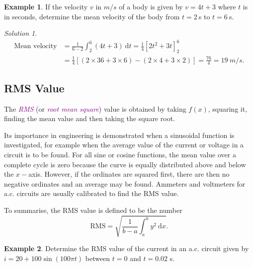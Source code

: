 \documentclass[
  english,
  11pt,
  oneside]{book}
\newcommand{\slide}{}
\theoremstyle{definition}
\theoremstyle{definition}
\newtheorem{example}{Example}[chapter]
\theoremstyle{definition}
\theoremstyle{definition}
\theoremstyle{remark}
\newtheorem*{solution}{Solution}
\begin{document}
\slide

\begin{example}
If the velocity \(v\) in \(m/s\) of a body is given by \(v=4t+3\) where \(t\) is in seconds, determine the mean velocity of the body from \(t=2\ \)s to \(t=6\ \)s.
\end{example}

\begin{solution}
\begin{align*}
\text{Mean velocity}& = \frac{1}{6-2}\int_2^6(4t+3)\ \mathrm{d}t = \frac 14\left[2t^2+3t\right]_2^6\\
&= \frac 14\left[(2\times36+3\times6) -(2\times4+3\times2)\right] = \frac{76}{4}=19\ m/s.
\end{align*}
\end{solution}

\slide

\subsection{RMS Value}\label{rms-value}

The \textcolor{purple}{\em RMS} (or \textcolor{purple}{\em root mean square}) value is obtained by taking \(f(x)\), squaring it, finding the mean value and then taking the square root.

Its importance in engineering is demonstrated when a sinusoidal function is investigated, for example when the average value of the current or voltage in a circuit is to be found. For all sine or cosine functions, the mean value over a complete cycle is zero because the curve is equally distributed above and below the \(x-\)axis. However, if the ordinates are squared first, there are then no negative ordinates and an average may be found. Ammeters and voltmeters for a.c. circuits are usually calibrated to find the RMS value.

To summarise, the RMS value is defined to be the number
\[\text{RMS} = \sqrt{\frac{1}{b-a}\int_a^b y^2\ \mathrm{d}x}.\]
\slide

\begin{example}
Determine the RMS value of the current in an a.c. circuit given by \(i=20+100\sin(100\pi t)\) between \(t=0\) and \(t=0.02\) s.
\end{example}
\end{document}
